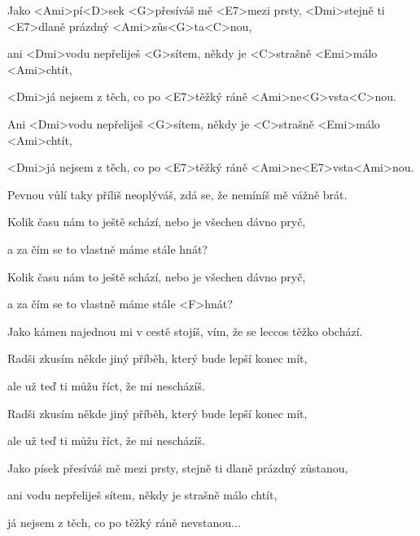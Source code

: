

\zs
Jako <Ami>pí<D>sek <G>přesíváš mě <E7>mezi prsty,
<Dmi>stejně ti <E7>dlaně prázdný <Ami>zůs<G>ta<C>nou, 

ani <Dmi>vodu nepřeliješ <G>sítem,
někdy je <C>strašně <Emi>málo <Ami>chtít,

<Dmi>já nejsem z těch, co po <E7>těžký ráně
<Ami>ne<G>vsta<C>nou.

Ani <Dmi>vodu nepřeliješ <G>sítem,
někdy je <C>strašně <Emi>málo <Ami>chtít, 

<Dmi>já nejsem z těch, co po <E7>těžký ráně
<Ami>ne<E7>vsta<Ami>nou. \ks

\zs
Pevnou vůlí taky příliš neoplýváš, zdá se, že nemíníš mě vážně brát. 

Kolik času nám to ještě schází, nebo je všechen dávno pryč, 

a za čím se to vlastně máme stále hnát? 

Kolik času nám to ještě schází, nebo je všechen dávno pryč, 

a za čím se to vlastně máme stále <F>hnát? 
\ks

\zs
Jako kámen najednou mi v cestě stojíš, vím, že se leccos těžko obchází. 

Radši zkusím někde jiný příběh, který bude lepší konec mít, 

ale už teď ti můžu říct, že mi nescházíš. 

Radši zkusím někde jiný příběh, který bude lepší konec mít, 

ale už teď ti můžu říct, že mi nescházíš. 
\ks

\zs
Jako písek přesíváš mě mezi prsty, stejně ti dlaně prázdný zůstanou, 

ani vodu nepřeliješ sítem, někdy je strašně málo chtít, 

já nejsem z těch, co po těžký ráně nevstanou...
\ks

\kp

